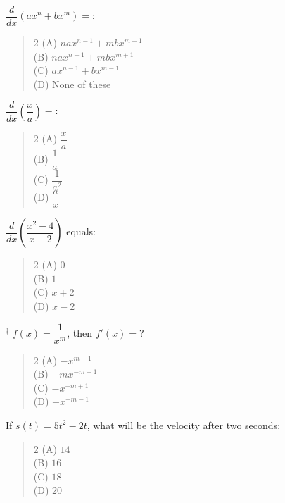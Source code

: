 \documentclass[11pt,a4paper]{article}
\begin{document}
\begin{mcqlist}
\item $\dfrac{d}{dx}(ax^n+bx^m) = $:
\begin{quote}\begin{multicols}{2}
\noindent (A) $nax^{n-1}+mbx^{m-1}$ \\
(B) $nax^{n-1}+mbx^{m+1}$ \\
(C) $ax^{n-1}+bx^{m-1}$ \\
(D) None of these
\end{multicols}\end{quote}

\item $\dfrac{d}{dx}\left(\dfrac{x}{a}\right) = $:
\begin{quote}\begin{multicols}{2}
\noindent (A) $\dfrac{x}{a}$ \\
(B) $\dfrac{1}{a}$ \\
(C) $\dfrac{1}{a^2}$ \\
(D) $\dfrac{a}{x}$
\end{multicols}\end{quote}

\item $\dfrac{d}{dx}\left(\dfrac{x^2-4}{x-2}\right)$ equals:
\begin{quote}\begin{multicols}{2}
\noindent (A) $0$ \\
(B) $1$ \\
(C) $x+2$ \\
(D) $x-2$
\end{multicols}\end{quote}

\item $^{\dagger}$ $f(x)=\dfrac{1}{x^m}$, then $f'(x) = $?
\begin{quote}\begin{multicols}{2}
\noindent (A) $-x^{m-1}$ \\
(B) $-mx^{-m-1}$ \\
(C) $-x^{-m+1}$ \\
(D) $-x^{-m-1}$
\end{multicols}\end{quote}

\item If $s(t)=5t^2-2t$, what will be the velocity after two seconds:
\begin{quote}\begin{multicols}{2}
\noindent (A) $14$ \\
(B) $16$ \\
(C) $18$ \\
(D) $20$
\end{multicols}\end{quote}


\end{mcqlist}
\end{document}
